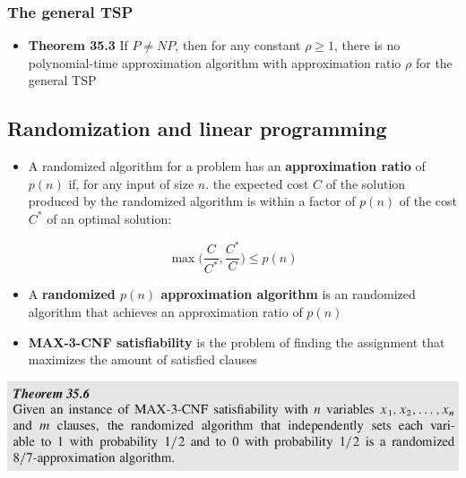 \documentclass[11pt]{article}
\begin{document}
\subsubsection{The general TSP}
\label{sec:orgf30f015}
\begin{itemize}
\item \textbf{Theorem 35.3} If \(P \neq NP\), then for any constant \(\rho \geq 1\), there is no polynomial-time approximation	algorithm with approximation ratio \(\rho\) for the general TSP
\end{itemize}

\subsection{Randomization and linear programming}
\label{sec:orgd841154}
\begin{itemize}
\item A randomized algorithm for a problem has an \textbf{approximation ratio} of \(p(n)\) if, for any input of size \(n\). the expected cost \(C\) of the solution produced by the randomized algorithm is within a factor of \(p(n)\) of the cost \(C^*\) of an optimal solution:
\end{itemize}
\begin{equation*}
	\max\bigg(\frac{C}{C^*},\frac{C^*}{C}\bigg) \leq p(n)
\end{equation*}
\begin{itemize}
\item A \textbf{randomized \(p(n)\) approximation algorithm} is an randomized algorithm that achieves an approximation ratio of \(p(n)\)

\item \textbf{MAX-3-CNF satisfiability} is the problem of finding the assignment that maximizes the amount of satisfied clauses
\end{itemize}


\begin{center}
\includegraphics[width=.9\linewidth]{Approximation Algorithms/screenshot_2019-04-25_15-38-03.png}
\end{center}
\end{document}
